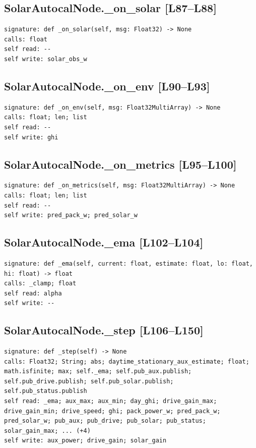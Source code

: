 \documentclass[a4paper,10pt,oneside]{book}
\begin{document}
\subsection*{SolarAutocalNode.\_on\_solar [L87--L88]}
\begin{lstlisting}[numbers=none]
signature: def _on_solar(self, msg: Float32) -> None
calls: float
self read: --
self write: solar_obs_w
\end{lstlisting}
\subsection*{SolarAutocalNode.\_on\_env [L90--L93]}
\begin{lstlisting}[numbers=none]
signature: def _on_env(self, msg: Float32MultiArray) -> None
calls: float; len; list
self read: --
self write: ghi
\end{lstlisting}
\subsection*{SolarAutocalNode.\_on\_metrics [L95--L100]}
\begin{lstlisting}[numbers=none]
signature: def _on_metrics(self, msg: Float32MultiArray) -> None
calls: float; len; list
self read: --
self write: pred_pack_w; pred_solar_w
\end{lstlisting}
\subsection*{SolarAutocalNode.\_ema [L102--L104]}
\begin{lstlisting}[numbers=none]
signature: def _ema(self, current: float, estimate: float, lo: float, hi: float) -> float
calls: _clamp; float
self read: alpha
self write: --
\end{lstlisting}
\subsection*{SolarAutocalNode.\_step [L106--L150]}
\begin{lstlisting}[numbers=none]
signature: def _step(self) -> None
calls: Float32; String; abs; daytime_stationary_aux_estimate; float; math.isfinite; max; self._ema; self.pub_aux.publish; self.pub_drive.publish; self.pub_solar.publish; self.pub_status.publish
self read: _ema; aux_max; aux_min; day_ghi; drive_gain_max; drive_gain_min; drive_speed; ghi; pack_power_w; pred_pack_w; pred_solar_w; pub_aux; pub_drive; pub_solar; pub_status; solar_gain_max; ... (+4)
self write: aux_power; drive_gain; solar_gain
\end{lstlisting}
\end{document}
